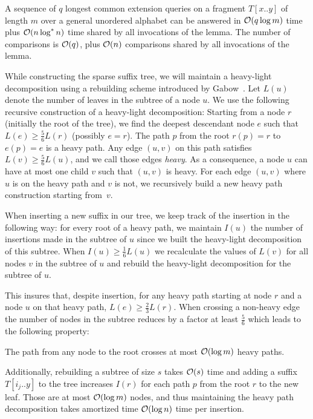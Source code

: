 \begin{corollary}
\label{lem:LCE_undordered}
A sequence of $q$ longest common extension queries on a fragment $T[x..y]$ of length $m$ over a general unordered alphabet can be answered in $\mathcal{O}(q \log m)$ time plus $\mathcal{O}(n \log^* n)$ time shared by all invocations of the lemma. The number of comparisons is $\mathcal{O}(q)$, plus $\mathcal{O}(n)$ comparisons shared by all invocations of the lemma.
\end{corollary}

While constructing the sparse suffix tree, we will maintain a heavy-light decomposition using a rebuilding scheme introduced by Gabow~\cite{Gabow1990}. Let $L(u)$ denote the number of leaves in the subtree of a node $u$.
%
We use the following recursive construction of a heavy-light decomposition: Starting from a node $r$ (initially the root of the tree), we find the deepest descendant node $e$ such that $L(e)\geq \frac{5}{6}L(r)$ (possibly $e = r$). The path $p$ from the root $r(p)=r$ to $e(p)=e$ is a heavy path. Any edge $(u,v)$ on this path satisfies $L(v)\geq \frac{5}{6}L(u)$, and we call those edges \emph{heavy}. As a consequence, a node $u$ can have at most one child $v$ such that $(u,v)$ is heavy. For each edge $(u,v)$ where $u$ is on the heavy path and $v$ is not, we recursively build a new heavy path construction starting from~$v$.
%


When inserting a new suffix in our tree, we keep track of the insertion in the following way: for every root of a heavy path, we maintain $I(u)$ the number of insertions made in the subtree of $u$ since we built the heavy-light decomposition of this subtree. When $I(u) \geq \frac{1}{6} L(u)$ we recalculate the values of $L(v)$ for all nodes $v$ in the subtree of $u$ and rebuild the heavy-light decomposition for the subtree of $u$.
%

This insures that, despite insertion, for any heavy path starting at node $r$ and 
a node $u$ on that heavy path, $L(e) \geq \frac{2}{3} L(r)$. When crossing a non-heavy edge the number of nodes in the subtree reduces by a factor at least $\frac{5}{6}$ which leads to the following property:

\begin{observation}
\label{obs:heavy}
The path from any node to the root crosses at most $\mathcal{O}(\log m)$ heavy paths.
\end{observation}

Additionally, rebuilding a subtree of size $s$ takes $\mathcal{O}(s)$ time and adding a suffix $T[i_j .. y]$ to the tree increases $I(r)$ for each path $p$ from the root $r$ to the new leaf. Those are at most $\mathcal{O}(\log m)$ nodes, and thus maintaining the heavy path decomposition takes amortized time $\mathcal{O}(\log n)$ time per insertion.


